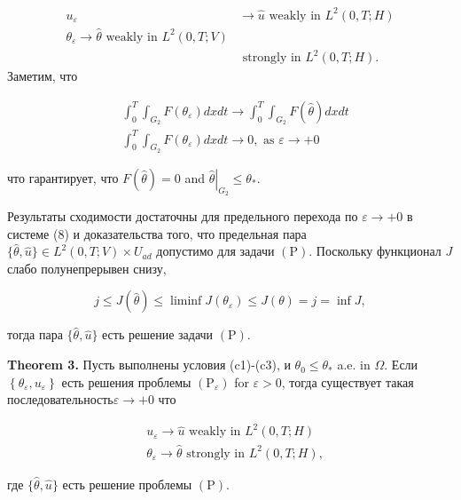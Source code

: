 \[
    \begin{aligned}
        u_{\varepsilon} & \rightarrow \widehat{u} \text { weakly in } L^{2}(0, T ; H) \\
        \theta_{\varepsilon} \rightarrow \widehat{\theta} \text { weakly in } L^{2}(0, T ; V) \\
        & \text { strongly in } L^{2}(0, T ; H) .
    \end{aligned}
\]
Заметим, что

\[
    \begin{aligned}
        &\int_{0}^{T} \int_{G_{2}} F\left(\theta_{\varepsilon}\right) d x d t
        \rightarrow \int_{0}^{T} \int_{G_{2}} F(\widehat{\theta}) d x d t \\
        &\int_{0}^{T} \int_{G_{2}} F\left(\theta_{\varepsilon}\right) d x d t
        \rightarrow 0, \text { as } \varepsilon \rightarrow+0
    \end{aligned}
\]

что гарантирует, что $F(\widehat{\theta})=0$ and $\left.\widehat{\theta}\right|_{G_{2}} \leq \theta_{*}$.

Результаты сходимости достаточны для предельного перехода по $\varepsilon \rightarrow+0$ в системе (8)
и доказательства того, что предельная пара
$\{\widehat{\theta}, \widehat{u}\} \in L ^{2}(0, T ; V) \times U_{a d}$
допустимо для задачи $(\mathrm{P})$.
Поскольку функционал $J$ слабо полунепрерывен снизу,

\[
    j \leq J(\widehat{\theta}) \leq \liminf J\left(\theta_{\varepsilon}\right) \leq J(\theta)=j=\inf J,
\]

тогда пара $\{\widehat{\theta}, \widehat{u}\}$ есть решение задачи $(\mathrm{P})$.

\textbf{Theorem 3.}
Пусть выполнены условия (c1)-(c3), и $\theta_{0} \leq \theta_{*}$ a.e. in $\Omega$.
Если $\left\{\theta_{\varepsilon}, u_{\varepsilon}\right\}$ есть решения проблемы
$\left(\mathrm{P}_{\varepsilon}\right)$ for $\varepsilon>0$, тогда существует
такая последовательность$\varepsilon \rightarrow+0$ что


\[
    \begin{aligned}
        &u_{\varepsilon} \rightarrow \widehat{u} \text { weakly in } L^{2}(0, T ; H) \\
        &\theta_{\varepsilon} \rightarrow \widehat{\theta} \text { strongly in } L^{2}(0, T ; H),
    \end{aligned}
\]


где $\{\widehat{\theta}, \widehat{u}\}$ есть решение проблемы $(\mathrm{P})$.

